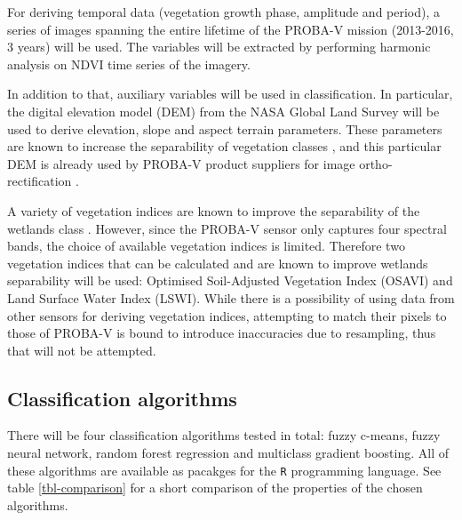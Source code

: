 \documentclass[a4paper,10pt]{book}
\begin{document}
For deriving temporal data (vegetation growth phase, amplitude and period), a series of images spanning the entire lifetime of the PROBA-V mission (2013-2016, 3 years) will be used. The variables will be extracted by performing harmonic analysis \citep{rayner1971introduction,jakubauskas2001harmonic} on NDVI time series of the imagery.

In addition to that, auxiliary variables will be used in classification. In particular, the digital elevation model (DEM) from the NASA Global Land Survey will be used to derive elevation, slope and aspect terrain parameters. These parameters are known to increase the separability of vegetation classes \citep{burrough2001fuzzy}, and this particular DEM is already used by PROBA-V product suppliers for image ortho-rectification \citep{probavguide}.

A variety of vegetation indices are known to improve the separability of the wetlands class \citep{zhao2009indices,davranche2010wetland}. However, since the PROBA-V sensor only captures four spectral bands, the choice of available vegetation indices is limited. Therefore two vegetation indices that can be calculated and are known to improve wetlands separability will be used: Optimised Soil-Adjusted Vegetation Index (OSAVI) and Land Surface Water Index (LSWI). While there is a possibility of using data from other sensors for deriving vegetation indices, attempting to match their pixels to those of PROBA-V is bound to introduce inaccuracies due to resampling, thus that will not be attempted.

\subsection{Classification algorithms}

There will be four classification algorithms tested in total: fuzzy c-means, fuzzy neural network, random forest regression and multiclass gradient boosting. All of these algorithms are available as pacakges for the \texttt{R} programming language. See table \ref{tbl-comparison} for a short comparison of the properties of the chosen algorithms.
\end{document}
